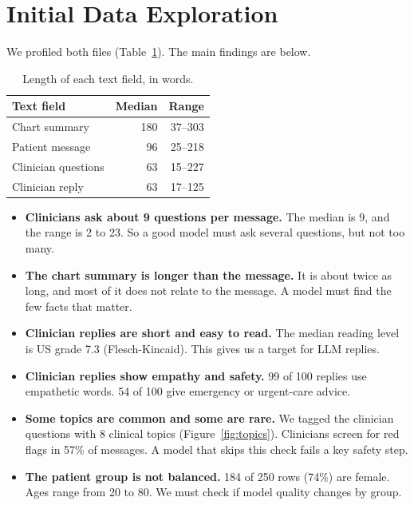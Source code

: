 \documentclass[11pt]{article}
\begin{document}
\section{Initial Data Exploration}

We profiled both files (Table~\ref{tab:lengths}).
The main findings are below.

\begin{table}[t]
\centering\small
\begin{tabular}{@{}lrr@{}}
\toprule
\textbf{Text field} & \textbf{Median} & \textbf{Range} \\
\midrule
Chart summary & 180 & 37--303 \\
Patient message & 96 & 25--218 \\
Clinician questions & 63 & 15--227 \\
Clinician reply & 63 & 17--125 \\
\bottomrule
\end{tabular}
\caption{Length of each text field, in words.}
\label{tab:lengths}
\end{table}

\begin{itemize}
  \item \textbf{Clinicians ask about 9 questions per message.} The median is 9, and the range is 2 to 23. So a good model must ask several questions, but not too many.
  \item \textbf{The chart summary is longer than the message.} It is about twice as long, and most of it does not relate to the message. A model must find the few facts that matter.
  \item \textbf{Clinician replies are short and easy to read.} The median reading level is US grade 7.3 (Flesch-Kincaid). This gives us a target for LLM replies.
  \item \textbf{Clinician replies show empathy and safety.} 99 of 100 replies use empathetic words. 54 of 100 give emergency or urgent-care advice.
  \item \textbf{Some topics are common and some are rare.} We tagged the clinician questions with 8 clinical topics (Figure~\ref{fig:topics}). Clinicians screen for red flags in 57\% of messages. A model that skips this check fails a key safety step.
  \item \textbf{The patient group is not balanced.} 184 of 250 rows (74\%) are female. Ages range from 20 to 80. We must check if model quality changes by group.
\end{itemize}
\end{document}
